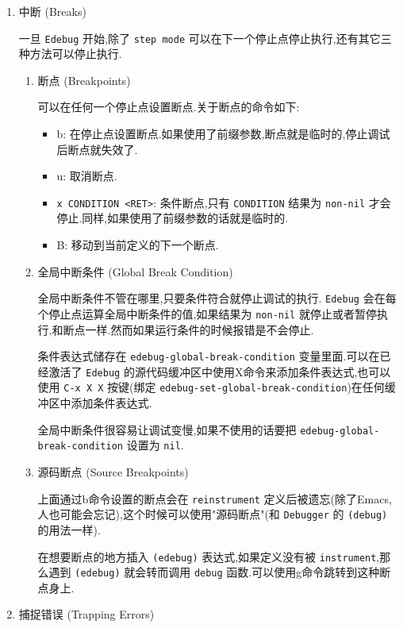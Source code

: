 \documentclass[11pt]{article}
\begin{document}
\begin{enumerate}
\item 中断 (Breaks)
\label{sec:orga448271}

一旦 \texttt{Edebug} 开始,除了 \texttt{step mode} 可以在下一个停止点停止执行,还有其它三种方法可以停止执行.

\begin{enumerate}
\item 断点 (Breakpoints)
\label{sec:orgc267c9f}

可以在任何一个停止点设置断点.关于断点的命令如下:

\begin{itemize}
\item b: 在停止点设置断点.如果使用了前缀参数,断点就是临时的,停止调试后断点就失效了.
\item u: 取消断点.
\item \texttt{x CONDITION <RET>}: 条件断点,只有 \texttt{CONDITION} 结果为 \texttt{non-nil} 才会停止.同样,如果使用了前缀参数的话就是临时的.
\item B: 移动到当前定义的下一个断点.
\end{itemize}

\item 全局中断条件 (Global Break Condition)
\label{sec:org129dbad}

全局中断条件不管在哪里,只要条件符合就停止调试的执行. \texttt{Edebug} 会在每个停止点运算全局中断条件的值,如果结果为 \texttt{non-nil} 就停止或者暂停执行,和断点一样.然而如果运行条件的时候报错是不会停止.

条件表达式储存在 \texttt{edebug-global-break-condition} 变量里面.可以在已经激活了 \texttt{Edebug} 的源代码缓冲区中使用X命令来添加条件表达式,也可以使用 \texttt{C-x X X} 按键(绑定 \texttt{edebug-set-global-break-condition})在任何缓冲区中添加条件表达式.

全局中断条件很容易让调试变慢,如果不使用的话要把 \texttt{edebug-global-break-condition} 设置为 \texttt{nil}.

\item 源码断点 (Source Breakpoints)
\label{sec:org194de51}

上面通过b命令设置的断点会在 \texttt{reinstrument} 定义后被遗忘(除了Emacs,人也可能会忘记),这个时候可以使用"源码断点"(和 \texttt{Debugger} 的 \texttt{(debug)} 的用法一样).

在想要断点的地方插入 \texttt{(edebug)} 表达式,如果定义没有被 \texttt{instrument},那么遇到 \texttt{(edebug)} 就会转而调用 \texttt{debug} 函数.可以使用g命令跳转到这种断点身上.
\end{enumerate}


\item 捕捉错误 (Trapping Errors)
\label{sec:org7576c47}


\end{enumerate}
\end{document}
